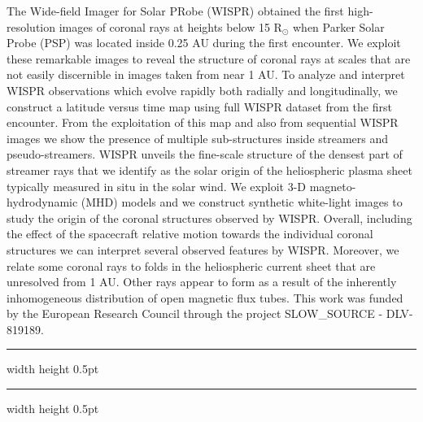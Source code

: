 \documentclass[a4paper,11pt]{book}
\def\doubleline{
\hrule width \hsize height 0.5pt  \kern 1mm \hrule width \hsize height 0.5pt 
}
\begin{document}
\vspace{2 mm}
\noindent The Wide-field Imager for Solar PRobe (WISPR) obtained the first high-resolution images of coronal rays at heights below 15 R$_\odot$ when Parker Solar Probe (PSP) was located inside 0.25 AU during the first encounter. We exploit these remarkable images to reveal the structure of coronal rays at scales that are not easily discernible in images taken from near 1 AU. To analyze and interpret WISPR observations which evolve rapidly both radially and longitudinally, we construct a latitude versus time map using full WISPR dataset from the first encounter. From the exploitation of this map and also from sequential WISPR images we show the presence of multiple sub-structures inside streamers and pseudo-streamers. WISPR unveils the fine-scale structure of the densest part of streamer rays that we identify as the solar origin of the heliospheric plasma sheet typically measured in situ in the solar wind. We exploit 3-D magneto-hydrodynamic (MHD) models and we construct synthetic white-light images to study the origin of the coronal structures observed by WISPR. Overall, including the effect of the spacecraft relative motion towards the individual coronal structures we can interpret several observed features by WISPR. Moreover, we relate some coronal rays to folds in the heliospheric current sheet that are unresolved from 1 AU. Other rays appear to form as a result of the inherently inhomogeneous distribution of open magnetic flux tubes. This work was funded by the European Research Council through the project SLOW\_SOURCE - DLV-819189.

\noindent\doubleline
        


 
\end{document}
